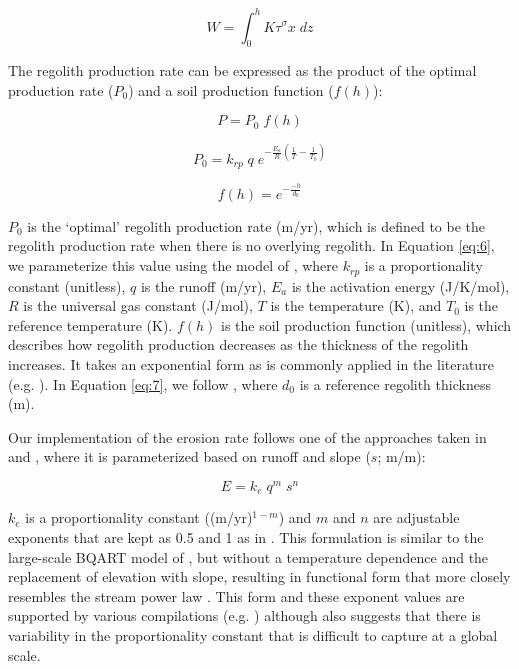 \documentclass[11pt,letterpaper]{article}
\begin{document}
\begin{equation}
    W = \int_{0}^{h} K \tau^{\sigma} x\;dz
    \label{eq:4}
\end{equation}

The regolith production rate can be expressed as the product of the optimal production rate ($P_{0}$) and a soil production function ($f(h)$):

\begin{equation}
    P = P_{0}\;f(h)
    \label{eq:5}
\end{equation}

\begin{equation}
    P_{0} = k_{rp}\;q\;e^{-\frac{E_{a}}{R}\left(\frac{1}{T}-\frac{1}{T_{0}}\right)}
    \label{eq:6}
\end{equation}

\begin{equation}
    f(h) = e^{-\frac{-h}{d_{0}}}
    \label{eq:7}
\end{equation}

\noindent
$P_{0}$ is the `optimal' regolith production rate (m/yr), which is defined to be the regolith production rate when there is no overlying regolith. In Equation \ref{eq:6}, we parameterize this value using the model of \citet{Carretier2014a}, where $k_{rp}$ is a proportionality constant (unitless), $q$ is the runoff (m/yr), $E_{a}$ is the activation energy (J/K/mol), $R$ is the universal gas constant (J/mol), $T$ is the temperature (K), and $T_{0}$ is the reference temperature (K). $f(h)$ is the soil production function (unitless), which describes how regolith production decreases as the thickness of the regolith increases. It takes an exponential form as is commonly applied in the literature (e.g. \citealp{Gabet2009a}). In Equation \ref{eq:7}, we follow \citet{Heimsath1997a}, where $d_{0}$ is a reference regolith thickness (m).

Our implementation of the erosion rate follows one of the approaches taken in \citet{Godderis2017c} and \citet{Maffre2018a}, where it is parameterized based on runoff and slope ($s$; m/m):

\begin{equation}
    E = k_{e}\;q^{m}\;s^{n}
    \label{eq:8}
\end{equation}

\noindent
$k_{e}$ is a proportionality constant ((m/yr)$^{1-m}$) and $m$ and $n$ are adjustable exponents that are kept as 0.5 and 1 as in \citet{Maffre2018a}. This formulation is similar to the large-scale BQART model of \citet{Syvitski2007a}, but without a temperature dependence and the replacement of elevation with slope, resulting in functional form that more closely resembles the stream power law \citep{Davy2000a}. This form and these exponent values are supported by various compilations (e.g. \citealp{Lague2014a}) although \citet{Lague2014a} also suggests that there is variability in the proportionality constant that is difficult to capture at a global scale.
\end{document}
